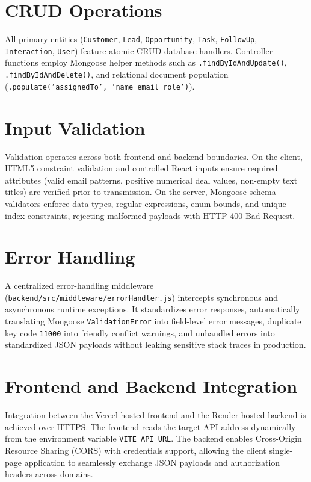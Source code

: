 \section{CRUD Operations}
All primary entities (\texttt{Customer}, \texttt{Lead}, \texttt{Opportunity}, \texttt{Task}, \texttt{FollowUp}, \texttt{Interaction}, \texttt{User}) feature atomic CRUD database handlers. Controller functions employ Mongoose helper methods such as \texttt{.findByIdAndUpdate()}, \texttt{.findByIdAndDelete()}, and relational document population (\texttt{.populate('assignedTo', 'name email role')}).

\section{Input Validation}
Validation operates across both frontend and backend boundaries. On the client, HTML5 constraint validation and controlled React inputs ensure required attributes (valid email patterns, positive numerical deal values, non-empty text titles) are verified prior to transmission. On the server, Mongoose schema validators enforce data types, regular expressions, enum bounds, and unique index constraints, rejecting malformed payloads with HTTP 400 Bad Request.

\section{Error Handling}
A centralized error-handling middleware (\texttt{backend/src/middleware/errorHandler.js}) intercepts synchronous and asynchronous runtime exceptions. It standardizes error responses, automatically translating Mongoose \texttt{ValidationError} into field-level error messages, duplicate key code \texttt{11000} into friendly conflict warnings, and unhandled errors into standardized JSON payloads without leaking sensitive stack traces in production.

\section{Frontend and Backend Integration}
Integration between the Vercel-hosted frontend and the Render-hosted backend is achieved over HTTPS. The frontend reads the target API address dynamically from the environment variable \texttt{VITE\_API\_URL}. The backend enables Cross-Origin Resource Sharing (CORS) with credentials support, allowing the client single-page application to seamlessly exchange JSON payloads and authorization headers across domains.
